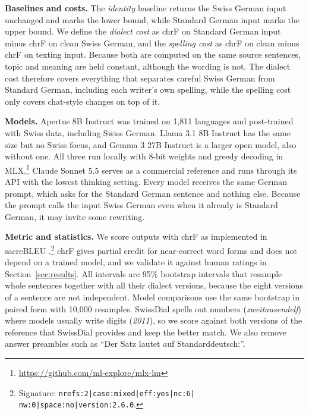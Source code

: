\documentclass[11pt]{article}
\begin{document}
\textbf{Baselines and costs.} The \emph{identity} baseline returns the Swiss German input unchanged
and marks the lower bound, while Standard German input marks the upper bound. We define the \emph{dialect cost} as chrF on Standard German
input minus chrF on clean Swiss German, and the \emph{spelling cost} as chrF on clean minus chrF on
texting input. Because both are computed on the same source sentences, topic and meaning are held
constant, although the wording is not. The dialect cost therefore covers everything that separates
careful Swiss German from Standard German, including each writer's own spelling, while the spelling
cost only covers chat-style changes on top of it.

\textbf{Models.} Apertus 8B Instruct \citep{apertus2025} was trained on 1,811 languages and
post-trained with Swiss data, including Swiss German. Llama 3.1 8B Instruct
\citep{grattafiori2024llama3} has the same size but no Swiss focus, and Gemma 3 27B Instruct
\citep{gemma2025gemma3} is a larger open model, also without one. All three run locally with 8-bit weights and greedy decoding in
MLX.\footnote{\url{https://github.com/ml-explore/mlx-lm}} Claude Sonnet 5.5 serves as a commercial
reference and runs through its API with the lowest thinking setting. Every model receives the same
German prompt, which asks for the Standard German sentence and nothing else. Because the prompt
calls the input Swiss German even when it already is Standard German, it may invite some rewriting.

\textbf{Metric and statistics.} We score outputs with chrF \citep{popovic2015chrf} as implemented in
sacreBLEU \citep{post2018sacrebleu}.\footnote{\raggedright Signature: \texttt{\footnotesize nrefs:2|case:mixed|eff:yes|nc:6|}
\texttt{\footnotesize nw:0|space:no|version:2.6.0}.} chrF gives partial credit for near-correct word
forms and does not depend on a trained model, and we validate it against human ratings in
Section~\ref{sec:results}. All intervals are 95\% bootstrap intervals \citep{koehn2004significance}
that resample whole sentences together with all their dialect versions, because the eight versions of
a sentence are not independent. Model comparisons use the same bootstrap in paired form with 10,000
resamples. SwissDial spells out numbers (\emph{zweitausendelf}) where models usually write digits
(\emph{2011}), so we score against both versions of the reference that SwissDial provides and keep
the better match. We also remove answer preambles such as ``Der Satz lautet auf Standarddeutsch:''.
\end{document}
